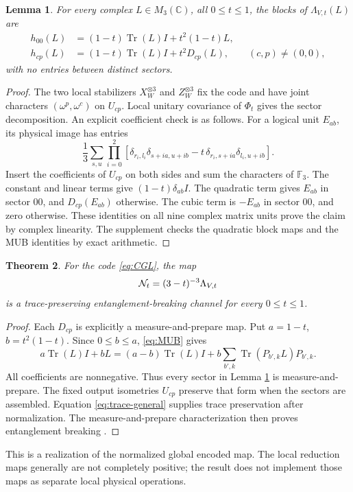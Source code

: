 \documentclass[11pt,a4paper]{article}
\newtheorem{theorem}{Theorem}
\newtheorem{lemma}[theorem]{Lemma}
\newcommand{\Tr}{\operatorname{Tr}}
\newcommand{\C}{\mathbb C}
\begin{document}
\begin{lemma}\label{lem:blocks}
For every complex \(L\in M_3(\C)\), all \(0\le t\le1\), the blocks of \(\Lambda_{V,t}(L)\) are
\begin{align*}
 h_{00}(L)&=(1-t)\Tr(L)I+t^2(1-t)L,\\
 h_{cp}(L)&=(1-t)\Tr(L)I+t^2D_{cp}(L),\qquad(c,p)\ne(0,0),
\end{align*}
with no entries between distinct sectors.
\end{lemma}
\begin{proof}
The two local stabilizers \(X_W^{\otimes3}\) and \(Z_W^{\otimes3}\) fix the code and have joint characters \((\omega^p,\omega^c)\) on \(U_{cp}\). Local unitary covariance of \(\Phi_t\) gives the sector decomposition. An explicit coefficient check is as follows. For a logical unit \(E_{ab}\), its physical image has entries
\[
 \frac13\sum_{s,u}\prod_{i=0}^2
 \left[
  \delta_{r_i,l_i}\delta_{s+ia,u+ib}
  -t\,\delta_{r_i,s+ia}\delta_{l_i,u+ib}
 \right].
\]
Insert the coefficients of \(U_{cp}\) on both sides and sum the characters of \(\mathbb F_3\). The constant and linear terms give \((1-t)\delta_{ab}I\). The quadratic term gives \(E_{ab}\) in sector \(00\), and \(D_{cp}(E_{ab})\) otherwise. The cubic term is \(-E_{ab}\) in sector \(00\), and zero otherwise. These identities on all nine complex matrix units prove the claim by complex linearity. The supplement checks the quadratic block maps and the MUB identities by exact arithmetic.
\end{proof}

\begin{theorem}\label{thm:EB}
For the code \eqref{eq:CGL}, the map
\[
 {\cal N}_t=(3-t)^{-3}\Lambda_{V,t}
\]
is a trace-preserving entanglement-breaking channel for every \(0\le t\le1\).
\end{theorem}
\begin{proof}
Each \(D_{cp}\) is explicitly a measure-and-prepare map. Put \(a=1-t\), \(b=t^2(1-t)\). Since \(0\le b\le a\), \eqref{eq:MUB} gives
\[
 a\Tr(L)I+bL=(a-b)\Tr(L)I
                   +b\sum_{b',k}\Tr(P_{b',k}L)P_{b',k}.
\]
All coefficients are nonnegative. Thus every sector in Lemma \ref{lem:blocks} is measure-and-prepare. The fixed output isometries \(U_{cp}\) preserve that form when the sectors are assembled. Equation \eqref{eq:trace-general} supplies trace preservation after normalization. The measure-and-prepare characterization then proves entanglement breaking \cite{HSR}.
\end{proof}
This is a realization of the normalized global encoded map. The local reduction maps generally are not completely positive; the result does not implement those maps as separate local physical operations.
\end{document}

